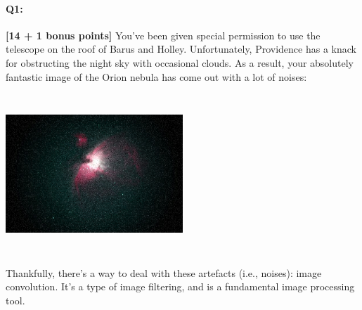 \documentclass[11pt]{article}
\begin{document}
\pagebreak

\paragraph{Q1:} \textbf{[14 + 1 bonus points]} You've been given special permission to use the telescope on the roof of Barus and Holley. Unfortunately, Providence has a knack for obstructing the night sky with occasional clouds. As a result, your absolutely fantastic image of the Orion nebula has come out with a lot of noises:

\includegraphics[width=0.5\textwidth,height=6cm,keepaspectratio]
{images/orion-noise.png}



Thankfully, there's a way to deal with these artefacts (i.e., noises): image convolution. It's a type of image filtering, and is a fundamental image processing tool.
\end{document}
